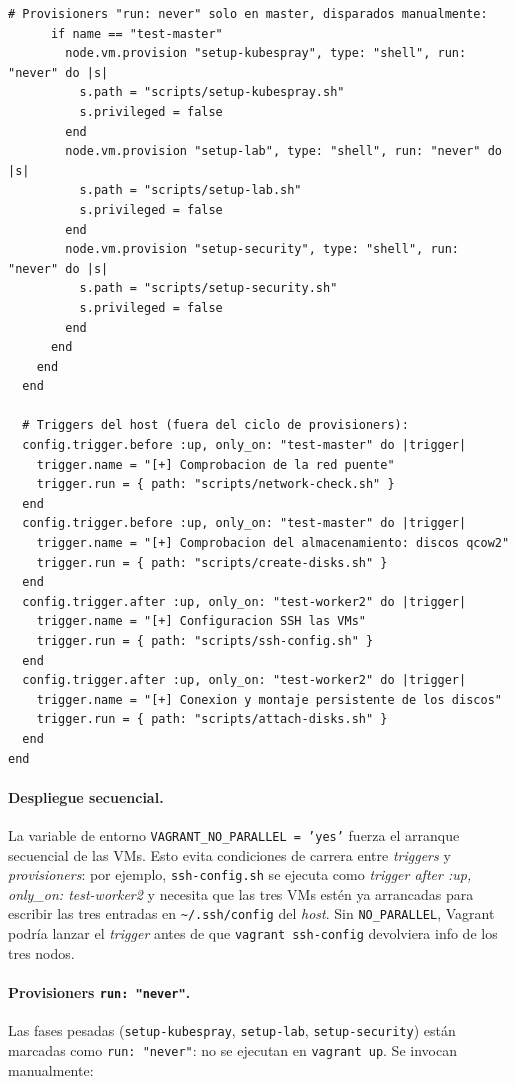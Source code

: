 \begin{lstlisting}[style=bash]
      # Provisioners "run: never" solo en master, disparados manualmente:
      if name == "test-master"
        node.vm.provision "setup-kubespray", type: "shell", run: "never" do |s|
          s.path = "scripts/setup-kubespray.sh"
          s.privileged = false
        end
        node.vm.provision "setup-lab", type: "shell", run: "never" do |s|
          s.path = "scripts/setup-lab.sh"
          s.privileged = false
        end
        node.vm.provision "setup-security", type: "shell", run: "never" do |s|
          s.path = "scripts/setup-security.sh"
          s.privileged = false
        end
      end
    end
  end

  # Triggers del host (fuera del ciclo de provisioners):
  config.trigger.before :up, only_on: "test-master" do |trigger|
    trigger.name = "[+] Comprobacion de la red puente"
    trigger.run = { path: "scripts/network-check.sh" }
  end
  config.trigger.before :up, only_on: "test-master" do |trigger|
    trigger.name = "[+] Comprobacion del almacenamiento: discos qcow2"
    trigger.run = { path: "scripts/create-disks.sh" }
  end
  config.trigger.after :up, only_on: "test-worker2" do |trigger|
    trigger.name = "[+] Configuracion SSH las VMs"
    trigger.run = { path: "scripts/ssh-config.sh" }
  end
  config.trigger.after :up, only_on: "test-worker2" do |trigger|
    trigger.name = "[+] Conexion y montaje persistente de los discos"
    trigger.run = { path: "scripts/attach-disks.sh" }
  end
end
\end{lstlisting}

\paragraph{Despliegue secuencial.} La variable de entorno \texttt{VAGRANT\_NO\_PARALLEL = 'yes'} fuerza el arranque secuencial de las VMs. Esto evita condiciones de carrera entre \emph{triggers} y \emph{provisioners}: por ejemplo, \texttt{ssh-config.sh} se ejecuta como \emph{trigger after :up, only\_on: test-worker2} y necesita que las tres VMs estén ya arrancadas para escribir las tres entradas en \texttt{\textasciitilde/.ssh/config} del \emph{host}. Sin \texttt{NO\_PARALLEL}, Vagrant podría lanzar el \emph{trigger} antes de que \texttt{vagrant ssh-config} devolviera info de los tres nodos.

\paragraph{Provisioners \texttt{run: "never"}.} Las fases pesadas (\texttt{setup-kubespray}, \texttt{setup-lab}, \texttt{setup-security}) están marcadas como \texttt{run: "never"}: no se ejecutan en \texttt{vagrant up}. Se invocan manualmente:

